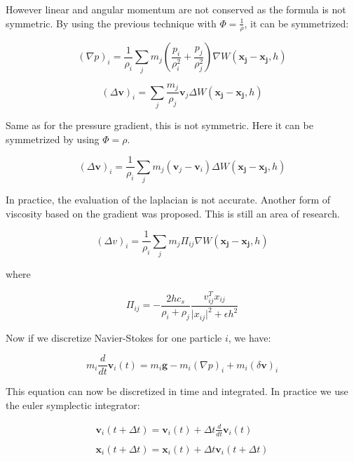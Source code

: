 \documentclass[11pt, oneside, a4paper]{memoir}
\begin{document}
However linear and angular momentum are not conserved as the formula is not symmetric. By using the previous technique with $\Phi = \frac{1}{\rho}$, it can be symmetrized:

\begin{equation}
\left(\nabla p\right)_{i} = 
\frac{1}{\rho_{i}}
\sum_{j} m_{j} \left( \frac{p_{i}}{\rho_{i}^{2}} + \frac{p_{j}}{\rho_{j}^{2}} \right) \nabla W(\mathbf{x_{j}}-\mathbf{x_{j}},h)
\end{equation}

\begin{equation}
\left(\Delta \mathbf{v}\right)_{i} = \sum_{j} \frac{m_{j}}{\rho_{j}} \mathbf{v}_{j} \Delta W(\mathbf{x_{j}}-\mathbf{x_{j}},h)
\end{equation}

Same as for the pressure gradient, this is not symmetric. Here it can be symmetrized by using $\Phi = \rho$.

\begin{equation}
\left(\Delta \mathbf{v}\right)_{i} = \frac{1}{\rho_{i}}\sum_{j} m_{j} \left( \mathbf{v}_{j}-\mathbf{v}_{i}\right) \Delta W(\mathbf{x_{j}}-\mathbf{x_{j}},h)
\end{equation}

In practice, the evaluation of the laplacian is not accurate. Another form of viscosity based on the gradient was proposed. This is still an area of research.

\begin{equation}
\left(\Delta v\right)_{i} = 
\frac{1}{\rho_{i}}
\sum_{j} m_{j} \Pi_{ij} \nabla W(\mathbf{x_{j}}-\mathbf{x_{j}},h)
\end{equation}

where 

\begin{equation}
\Pi_{ij} = -\frac{2hc_{s}}{\rho_{i}+\rho_{j}}\frac{v_{ij}^{T}x_{ij}}{\vert x_{ij} \vert^{2} + \epsilon h^{2}}
\end{equation}

Now if we discretize Navier-Stokes for one particle $i$, we have:

\begin{equation}
m_{i}\frac{d}{dt}\mathbf{v}_{i}(t) = m_{i}\mathbf{g} - m_{i}(\nabla p)_{i} + m_{i}(\delta \mathbf{v})_{i}
\end{equation}

This equation can now be discretized in time and integrated. In practice we use the euler symplectic integrator:

\begin{equation}
\begin{array}{ll}
\displaystyle \mathbf{v}_{i}(t+\Delta t) = \mathbf{v}_{i}(t) + \Delta t \frac{d}{dt}\mathbf{v}_{i}(t) \\ \\
\displaystyle \mathbf{x}_{i}(t+\Delta t) = \mathbf{x}_{i}(t) + \Delta t \mathbf{v}_{i}(t+\Delta t)
\end{array}
\end{equation}
\end{document}
